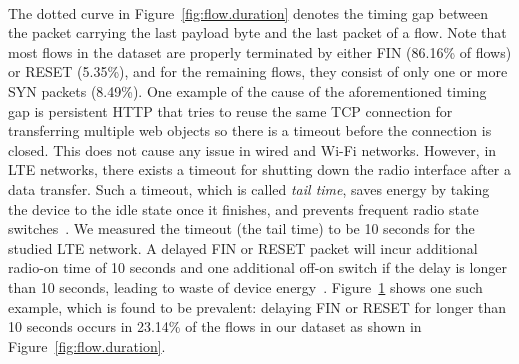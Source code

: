 \begin{figure}[t]
\centering
{}\\
\label{fig:delayed_fin}
\end{figure}

The dotted curve in Figure~\ref{fig:flow.duration} denotes the timing gap between the packet carrying the last payload byte and the last packet of a flow. Note that most flows in the dataset are properly terminated by either FIN (86.16\% of flows) or RESET (5.35\%), and for the remaining flows, they consist of only one or more SYN packets (8.49\%). One example of the cause of the aforementioned timing gap is persistent HTTP that tries to reuse the same TCP connection for transferring multiple web objects so there is a timeout before the connection is closed. This does not cause any issue in wired and Wi-Fi networks. However, in LTE networks, there exists a timeout for shutting down the radio interface after a data transfer. Such a timeout, which is called \emph{tail time}, saves energy by taking the device to the idle state once it finishes, and prevents frequent radio state switches~\cite{huang12_mobisys}. We measured the timeout (\ie the tail time) to be 10 seconds for the studied LTE network. A delayed FIN or RESET packet will incur additional radio-on time of 10 seconds and one additional off-on switch if the delay is longer than 10 seconds, leading to waste of device energy~\cite{mobisys.aro}. Figure~\ref{fig:delayed_fin} shows one such example, which is found to be prevalent: delaying FIN or RESET for longer than 10 seconds occurs in 23.14\% of the flows in our dataset as shown in Figure~\ref{fig:flow.duration}.


\begin{figure}[t]
\centering
{}\\
\label{fig:flow.rate}
\end{figure}

